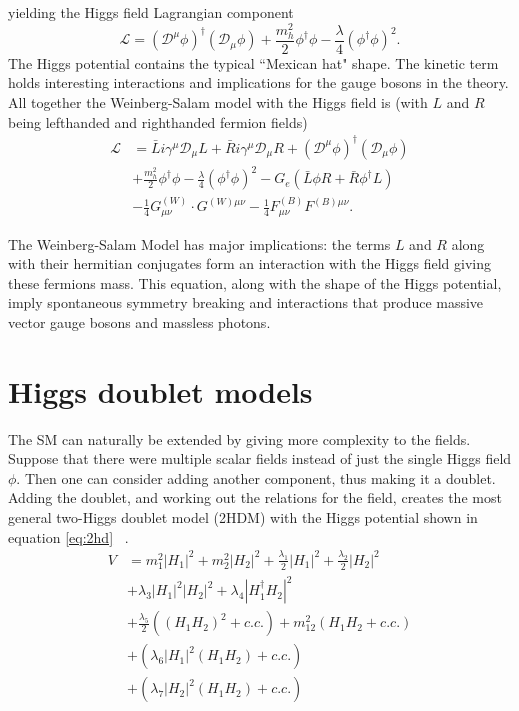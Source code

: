 yielding the Higgs field Lagrangian component 
\begin{equation}\mathcal{L} = (\mathcal{D}^\mu \phi)^\dag (\mathcal{D}_\mu \phi) + \frac{m^2_h}{2}\phi^\dag \phi - \frac{\lambda}{4}(\phi^\dag\phi)^2 \text{.}\end{equation} 
The Higgs potential contains the typical ``Mexican hat" shape. The kinetic term holds interesting interactions and implications for the gauge bosons in the theory. 
All together the Weinberg-Salam model with the Higgs field is (with $L$ and $R$ being lefthanded and righthanded fermion fields) ~\cite{Lancaster:1629337}
\begin{align}
\label{eq:ws}
\mathcal{L} &= \bar{L}i \gamma^\mu \mathcal{D}_\mu L +\bar{R}i \gamma^\mu \mathcal{D}_\mu R + (\mathcal{D}^\mu \phi)^\dag(\mathcal{D}_\mu\phi)  \\
            &+\frac{m^2_h}{2}\phi^\dag \phi - \frac{\lambda}{4}(\phi^\dag\phi)^2 - G_e(\bar{L}\phi R +\bar{R}\phi^\dag L)\nonumber \\
            &-\frac{1}{4}G^{(W)}_{\mu\nu}\cdot G^{(W)\mu\nu} - \frac{1}{4}F^{(B)}_{\mu\nu} F^{(B)\mu\nu}    \text{.} 
\end{align}

The Weinberg-Salam Model has major implications: the terms $L$ and $R$ along with their hermitian conjugates form an interaction with the Higgs field giving these fermions mass. 
This equation, along with the shape of the Higgs potential, imply spontaneous symmetry breaking and interactions that produce massive vector gauge bosons and massless photons. 

\section{Higgs doublet models}
The SM can naturally be extended by giving more complexity to the fields. 
Suppose that there were multiple scalar fields instead of just the single Higgs field $\phi$. Then one can consider adding another component, thus making it a doublet. Adding the doublet, and working out the relations for the field, creates the most general two-Higgs doublet model (2HDM) with the Higgs potential shown in equation \ref{eq:2hd} ~\cite{Branco_2012}.
\begin{align} 
\label{eq:2hd}
V &= m^2_1|H_1|^2 + m^2_2|H_2|^2 + \frac{\lambda_1}{2}|H_1|^2 + \frac{\lambda_2}{2}|H_2|^2  \\
    &+\lambda_3|H_1|^2|H_2|^2 + \lambda_4|H^\dag_1 H_2|^2 \nonumber \\
    &+\frac{\lambda_5}{2}\left((H_1H_2)^2 + c.c.\right) +m^2_{12}\left(H_1 H_2 + c.c.\right) \nonumber \\
    &+\left(\lambda_6|H_1|^2(H_1 H_2) + c.c.\right) \nonumber \\
    &+\left(\lambda_7|H_2|^2(H_1 H_2) + c.c.\right) \nonumber 
\end{align}


